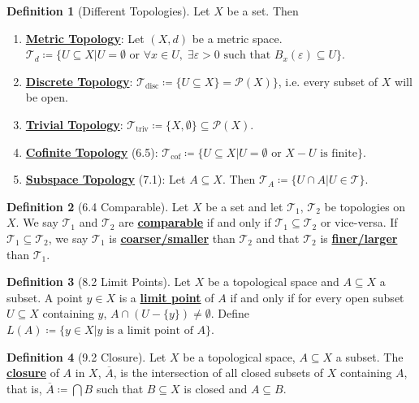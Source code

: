 \documentclass{article}
\newcommand{\Iff}{if and only if}
\newcommand{\ts}{topological space}
\newcommand{\es}{\ensuremath{\emptyset}}
\newcommand{\coleq}{\ensuremath{\coloneqq}}
\newcommand{\powset}[1]{\ensuremath{\mathcal{P}(#1)}}
\newcommand{\define}[1]{\textbf{\underline{#1}}}
\newcommand{\closure}[1]{\ensuremath{\overline{#1}}}
\newcommand{\ball}[3]{\ensuremath{B_{#1}^{#2}(#3)}}
\newcommand{\tp}{\ensuremath{\mathscr{T}}}
\newcommand{\tpcof}{\ensuremath{\tp_\text{cof}}}
\newcommand{\tpdisc}{\ensuremath{\tp_\text{disc}}}
\newcommand{\tptriv}{\ensuremath{\tp_\text{triv}}}
\newcommand{\inter}{\cap}
\newcommand{\Inter}{\bigcap}
\renewcommand{\Subset}{\subseteq}
\theoremstyle{definition}
\newtheorem*{defn}{Definition}
\theoremstyle{remark}
\begin{document}
{        \begin{defn}[Different Topologies]
            Let $X$ be a set. Then
            \begin{enumerate}
                \item \define{Metric Topology}: Let $(X,d)$ be a metric space. $\tp_d \coleq \{U \Subset X|U= \es \text{ or }\forall x \in U, \; \exists\varepsilon>0 \text{ such that } \ball{x}{}{\varepsilon} \Subset U\}$.
                \item \define{Discrete Topology}: $\tpdisc \coleq \{U \Subset X\} = \powset{X}\}$, i.e. every subset of $X$ will be open.
                \item \define{Trivial Topology}: $\tptriv \coleq \{X,\es\} \Subset \powset{X}$.
                \item \define{Cofinite Topology} (6.5): $\tpcof \coleq \{U \Subset X | U = \es \text{ or } X-U \text{ is finite}\}$.
                \item \define{Subspace Topology} (7.1): Let $A \Subset X$. Then $\tp_A \coleq \{U \inter A|U \in \tp\}$.
            \end{enumerate}
        \end{defn}
        
        \begin{defn}[6.4 Comparable]
            Let $X$ be a set and let $\tp_1, \, \tp_2$ be topologies on $X$. We say $\tp_1$ and $\tp_2$ are \define{comparable} \Iff{} $\tp_1 \Subset \tp_2$ or vice-versa. If $\tp_1 \Subset \tp_2$, we say $\tp_1$ is \define{coarser/smaller} than $\tp_2$ and that $\tp_2$ is \define{finer/larger} than $\tp_1$.
        \end{defn}
        
        \begin{defn}[8.2 Limit Points]
            Let $X$ be a \ts{} and $A \Subset X$ a subset. A point $y \in X$ is a \define{limit point} of $A$ \Iff{} for every open subset $U \Subset X$ containing $y$, $A \inter (U-\{y\}) \neq \es$. Define $L(A) \coleq \{y\in X| \text{$y$ is a limit point of $A$}\}$.
        \end{defn}
        
        \begin{defn}[9.2 Closure]
            Let $X$ be a \ts{}, $A \Subset X$ a subset. The \define{closure} of $A$ in $X$, $\closure{A}$, is the intersection of all closed subsets of $X$ containing $A$, that is, $\closure{A} \coleq \Inter B$ such that $B \Subset X$ is closed and $A \Subset B$.
        \end{defn}
        
}
\end{document}
